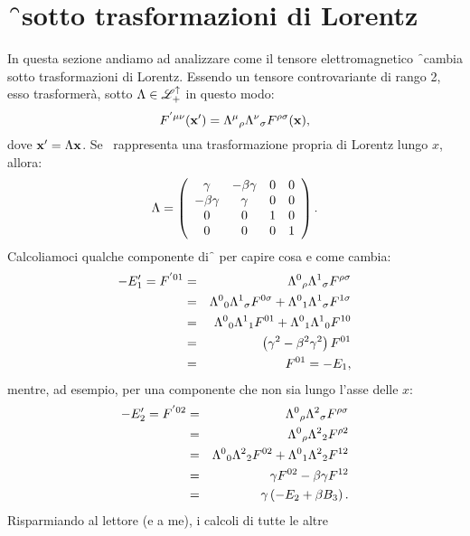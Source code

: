 \section{\f \ sotto trasformazioni di Lorentz}
In questa sezione andiamo ad analizzare come il tensore
elettromagnetico \f \ cambia sotto trasformazioni di Lorentz.  Essendo
un tensore controvariante di rango 2, esso trasformer\`a, sotto $\Lambda
\in \mathscr{L}_{+}^{\uparrow}$ in questo modo:
\begin{displaymath}
F^{'\mu\nu}(\mathbf{x}') = \Lambda^{\mu}{}_{\rho}\Lambda^{\nu}{}_{\sigma}
F^{\rho\sigma}(\mathbf{x}),
\end{displaymath}
dove $\mathbf{x}'=\Lambda \mathbf{x}$. Se \la \ rappresenta una trasformazione
propria di Lorentz lungo $x$, allora:
\begin{displaymath}
\Lambda = \left(
  \begin{array}{cccc}
    \gamma & - \beta \gamma & 0 & 0\\
    -\beta \gamma & \gamma & 0 & 0\\
    0&0&1&0\\
    0&0&0&1
  \end{array}
\right).
\end{displaymath}
Calcoliamoci qualche componente di \f \, per capire cosa e come
cambia:
\begin{eqnarray*}
  -E'_1  =  F^{'01} & = &
  \Lambda^0{}_{\rho}\Lambda^{1}{}_{\sigma}F^{\rho\sigma}\\
  & = & \Lambda^0{}_{0}\Lambda^{1}{}_{\sigma}F^{0\sigma} +
  \Lambda^0{}_{1}\Lambda^{1}{}_{\sigma}F^{1\sigma} \\
  & = & \Lambda^0{}_{0}\Lambda^{1}{}_{1}F^{01} +
  \Lambda^0{}_{1}\Lambda^{1}{}_{0}F^{10} \\
  & = & \left( \gamma^2 - \beta^2\gamma^2\right)F^{01}\\
  & = & F^{01} = -E_1,
\end{eqnarray*}
mentre, ad esempio, per una componente che non sia lungo l'asse delle
$x$:
\begin{eqnarray*}
  -E'_2  =  F^{'02} & = &
  \Lambda^0{}_{\rho}\Lambda^{2}{}_{\sigma}F^{\rho\sigma} \\
  & = & \Lambda^0{}_{\rho}\Lambda^{2}{}_{2}F^{\rho2}\\
  & = & \Lambda^0{}_{0}\Lambda^{2}{}_{2}F^{02} +
  \Lambda^0{}_{1}\Lambda^{2}{}_{2}F^{12} \\
  & =& \gamma F^{02} -\beta\gamma F^{12}\\
  & = & \gamma \left( -E_2 + \beta B_3 \right).
\end{eqnarray*}
Risparmiando al lettore (e a me), i calcoli di tutte le altre
